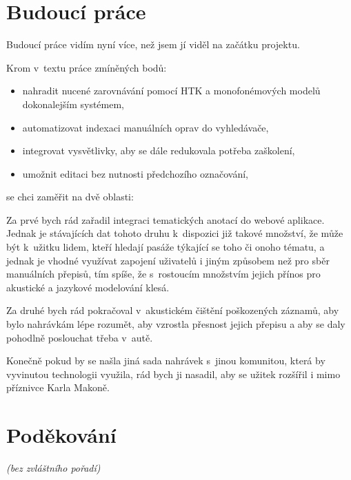 \section{Budoucí práce}

Budoucí práce vidím nyní více, než jsem jí viděl na začátku projektu.

Krom v~textu práce zmíněných bodů:
\begin{itemize}
\item{nahradit nucené zarovnávání pomocí HTK a monofonémových modelů
dokonalejším systémem,}
\item{automatizovat indexaci manuálních oprav do vyhledávače,}
\item{integrovat vysvětlivky, aby se dále redukovala potřeba zaškolení,}
\item{umožnit editaci bez nutnosti předchozího označování,}
\end{itemize}
se chci zaměřit na dvě oblasti:

Za prvé bych rád zařadil integraci tematických anotací do
webové aplikace. Jednak je stávajících dat tohoto druhu k~dispozici již takové
množství, že může být k~užitku lidem, kteří hledají pasáže týkající se toho či
onoho tématu, a jednak je vhodné využívat zapojení uživatelů i jiným způsobem
než pro sběr manuálních přepisů, tím spíše, že s~rostoucím množstvím jejich
přínos pro akustické a jazykové modelování klesá.

Za druhé bych rád pokračoval v~akustickém čištění poškozených záznamů, aby bylo
nahrávkám lépe rozumět, aby vzrostla přesnost jejich přepisu a aby se daly
pohodlně poslouchat třeba v~autě.

Konečně pokud by se našla jiná sada nahrávek s~jinou komunitou, která by
vyvinutou technologii využila, rád bych ji nasadil, aby se užitek rozšířil i
mimo příznivce Karla Makoně.

\section{Poděkování}

{\em (bez zvláštního pořadí)}

